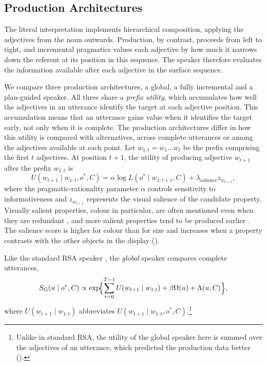 \documentclass[10pt,a4paper,fleqn]{article}
\begin{document}
\subsection{Production Architectures}
\label{sec:model:architectures}

The literal interpretation implements hierarchical composition, applying the adjectives from the noun outwards.
Production, by contrast, proceeds from left to right, and incremental pragmatics values each adjective by how much it narrows down the referent at its position in this sequence.
The speaker therefore evaluates the information available after each adjective in the surface sequence.

We compare three production architectures, a global, a fully incremental and a plan-guided speaker.
All three share a \emph{prefix utility}, which accumulates how well the adjectives in an utterance identify the target at each adjective position.
This accumulation means that an utterance gains value when it identifies the target early, not only when it is complete.
The production architectures differ in how this utility is compared with alternatives, across complete utterances or among the adjectives available at each point.
Let $w_{1:t}=w_1\ldots w_t$ be the prefix comprising the first $t$ adjectives.
At position $t+1$, the utility of producing adjective $w_{t+1}$ after the prefix $w_{1:t}$ is
\begin{equation}
  U(w_{t+1}\mid w_{1:t},o^*,C)
  = \alpha\log L(o^*\mid w_{1:t+1},C)
  + \lambda_{\mathrm{salience}}z_{w_{t+1}},
  \label{eq:prefix-raw-utility}
\end{equation}
where the pragmatic-rationality parameter $\alpha$ controls sensitivity to informativeness and $z_{w_{t+1}}$ represents the visual salience of the candidate property.
Visually salient properties, colour in particular, are often mentioned even when they are redundant \citep[p.~2]{rubio2016redundant}, and more salient properties tend to be produced earlier \citep[p.~47]{fukumura2018ordering}.
The salience score is higher for colour than for size and increases when a property contrasts with the other objects in the display ().

Like the standard RSA speaker \citep{frank2012predicting,goodman2016pragmatic}, the \emph{global} speaker compares complete utterances,
\begin{equation}
  S_{\mathrm{G}}(u\mid o^*,C)
  \propto
  \exp\!\Bigl\{
    \sum_{t=0}^{T-1}U(w_{t+1}\mid w_{1:t})
    +\beta\Omega(u)
    +\Lambda(u,C)
  \Bigr\},
  \label{eq:global-speaker}
\end{equation}
where $U(w_{t+1}\mid w_{1:t})$ abbreviates $U(w_{t+1}\mid w_{1:t},o^*,C)$.\footnote{Unlike in standard RSA, the utility of the global speaker here is summed over the adjectives of an utterance, which predicted the production data better ().}
\end{document}
